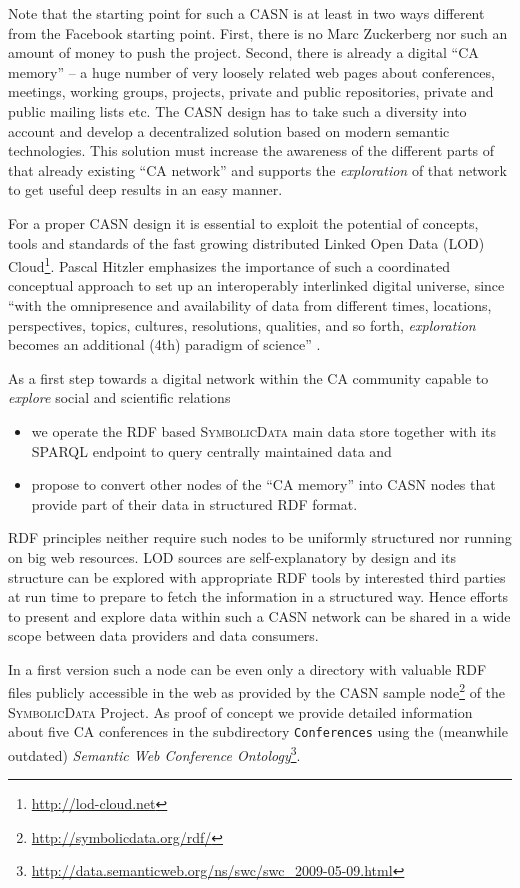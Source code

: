 \documentclass[a4paper,11pt]{article}
\def\SD{\textsc{Symbolic\-Data}}
\begin{document}
\begin{multicols}{2}
Note that the starting point for such a CASN is at least in two ways different
from the Facebook starting point. First, there is no Marc Zuckerberg nor such
an amount of money to push the project. Second, there is already a digital ``CA
memory'' -- a huge number of very loosely related web pages about conferences,
meetings, working groups, projects, private and public repositories, private
and public mailing lists etc. The CASN design has to take such a diversity into
account and develop a decentralized solution based on modern semantic
technologies. This solution must increase the awareness of the different parts
of that already existing ``CA network'' and supports the \emph{exploration} of
that network to get useful deep results in an easy manner.


For a proper CASN design it is essential to exploit the potential of concepts,
tools and standards of the fast growing distributed Linked Open Data (LOD)
Cloud\footnote{ \url{http://lod-cloud.net}}.  Pascal Hitzler emphasizes the
importance of such a coordinated conceptual approach to set up an
interoperably interlinked digital universe, since ``with the omnipresence and
availability of data from different times, locations, perspectives, topics,
cultures, resolutions, qualities, and so forth, \emph{exploration} becomes an
additional (4th) paradigm of science'' \cite{hitzler-13}.

As a first step towards a digital network within the CA community capable to
\emph{explore} social and scientific relations
\begin{itemize}
\item we operate the RDF based {\SD} main data store together with its SPARQL
  endpoint \cite{sdsparql} to query centrally maintained data and
\item propose to convert other nodes of the ``CA memory'' into CASN nodes that
  provide part of their data in structured RDF format.
\end{itemize}
RDF principles neither require such nodes to be uniformly structured nor
running on big web resources. LOD sources are self-explanatory by design and
its structure can be explored with appropriate RDF tools by interested third
parties at run time to prepare to fetch the information in a structured way.
Hence efforts to present and explore data within such a CASN network can be
shared in a wide scope between data providers and data consumers.

In a first version such a node can be even only a directory with valuable RDF
files publicly accessible in the web as provided by the CASN sample
node\footnote{ \url{http://symbolicdata.org/rdf/}} of the {\SD} Project. As
proof of concept we provide detailed information about five CA conferences in
the subdirectory \texttt{Conferences} using the (meanwhile outdated)
\emph{Semantic Web Conference Ontology}\footnote{
  \url{http://data.semanticweb.org/ns/swc/swc_2009-05-09.html}}.


\end{multicols}
\end{document}
